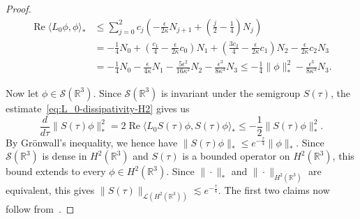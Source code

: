 \documentclass[11pt]{article}
\DeclareMathOperator{\real}{Re}
\begin{document}
\begin{proof}
\begin{equation}
    \begin{split}
      \real \langle L_{0}\phi, \phi\rangle_{*}
      &\leq \sum_{j = 0}^{2}c_{j}\left(-\frac{\epsilon}{2\kappa} N_{j + 1} + \left(\frac{j}{2} - \frac{1}{4}\right)N_{j}\right)\\
      &= -\frac{1}{4}N_{0}
        + \left(\frac{c_{1}}{4} - \frac{\epsilon}{2\kappa} c_{0}\right)N_{1}
        + \left(\frac{3c_{2}}{4} - \frac{\epsilon}{2\kappa} c_{1}\right)N_{2}
        - \frac{\epsilon}{2\kappa} c_{2} N_{3}\\
      &= -\frac{1}{4}N_{0} - \frac{\epsilon}{4\kappa}N_{1} - \frac{5\epsilon^{2}}{16\kappa^{2}}N_{2} - \frac{\epsilon^{3}}{8\kappa^{3}}N_{3}
        \leq -\frac{1}{4}\|\phi\|_{*}^{2} - \frac{\epsilon^{3}}{8\kappa^{3}} N_{3}.
    \end{split}
  \end{equation}

  Now let \(\phi \in \mathcal{S}(\mathbb{R}^{3})\). Since
  \(\mathcal{S}(\mathbb{R}^{3})\) is invariant under the semigroup
  \(S(\tau)\), the estimate~\eqref{eq:L_0-dissipativity-H2} gives us
  \begin{equation*}
    \frac{d}{d\tau}\|S(\tau)\phi\|_{*}^{2}
    = 2\real\langle L_{0}S(\tau)\phi, S(\tau)\phi \rangle_{*}
    \leq -\frac{1}{2}\|S(\tau)\phi\|_{*}^{2}.
  \end{equation*}
  By Grönwall's inequality, we hence have
  \(\|S(\tau)\phi\|_{*} \leq e^{-\frac{\tau}{4}}\|\phi\|_{*}\). Since
  \(\mathcal{S}(\mathbb{R}^{3})\) is dense in
  \(H^{2}(\mathbb{R}^{3})\) and \(S(\tau)\) is a bounded operator on
  \(H^{2}(\mathbb{R}^{3})\), this bound extends to every
  \(\phi \in H^{2}(\mathbb{R}^{3})\). Since \(\|\cdot\|_{*}\) and
  \(\|\cdot\|_{H^{2}(\mathbb{R}^{3})}\) are equivalent, this gives
  \(\|S(\tau)\|_{\mathcal{L}(H^{2}(\mathbb{R}^{3}))} \lesssim
  e^{-\frac{\tau}{4}}\). The first two claims now follow
  from~\cite[Chapter~II, Theorem~1.10]{Engel2000}.


\end{proof}
\end{document}
